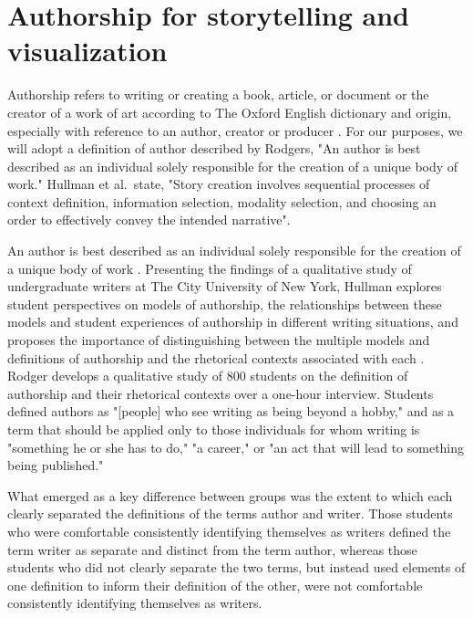 \documentclass{egpubl}
\begin{document}
\section{Authorship for storytelling and visualization}
Authorship refers to writing or creating a book, article, or document or the creator of a work of art according to The Oxford English dictionary\cite{authoship2} and origin, especially with reference to an author, creator or producer \cite{authoship1}. For our purposes, we will adopt a definition of author described by Rodgers\cite{rodgers2011}, "An author is best described as an individual solely responsible for the creation of a unique body of work."  Hullman \cite{hullman2013deeper} et al.\ state, "Story creation involves sequential processes of context definition, information selection, modality selection, and choosing an order to effectively convey the intended narrative".

An author is best described as an individual solely responsible for the creation of a unique body of work \cite{rodgers2011}.
 Presenting the findings of a qualitative study of undergraduate writers at The City University of New York, Hullman explores student perspectives on models of authorship, the relationships between these models and student experiences of authorship in different writing situations, and proposes the importance of distinguishing between the multiple models and definitions of authorship and the rhetorical contexts associated with each \cite{rodgers2011}.
Rodger develops a qualitative study of 800 students on the definition of authorship and their rhetorical contexts over a one-hour interview.
Students defined authors as "[people] who see writing as being beyond a hobby," and as a term that should be applied only to those
individuals for whom writing is "something he or she has to do," "a career," or "an act that will lead to something being published." 

What emerged as a key difference between groups was the extent to which each clearly separated the definitions of the terms author and writer. Those students who were comfortable consistently identifying themselves as writers defined the term writer as separate and distinct from the term author, whereas those students who did not clearly separate the two terms, but instead used elements of one definition to inform their definition of the other, were not comfortable consistently identifying themselves as writers.
\end{document}
